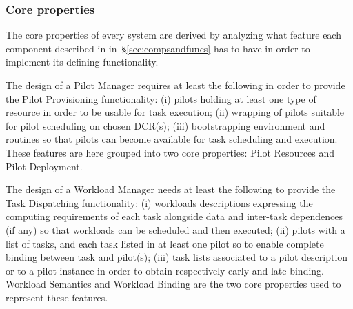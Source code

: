 \documentclass{sig-alternate}
\begin{document}

\subsubsection{Core properties}
\label{sec:coreprops}

The core properties of every \pilot system are derived by analyzing what feature
each component described in in~\S\ref{sec:compsandfuncs} has to have in order to
implement its defining functionality.

The design of a Pilot Manager requires at least the following in order to
provide the Pilot Provisioning functionality: (i) pilots holding at least one
type of resource in order to be usable for task execution; (ii) wrapping of
pilots suitable for pilot scheduling on chosen DCR(s); (iii) bootstrapping
environment and routines so that pilots can become available for task scheduling
and execution. These features are here grouped into two core properties: Pilot
Resources and Pilot Deployment.

The design of a Workload Manager needs at least the following to provide the
Task Dispatching functionality: (i) workloads descriptions expressing the
computing requirements of each task alongside data and inter-task dependences
(if any) so that workloads can be scheduled and then executed; (ii) pilots with
a list of tasks, and each task listed in at least one pilot so to enable
complete binding between task and pilot(s); (iii) task lists associated to a
pilot description or to a pilot instance in order to obtain respectively early
and late binding. Workload Semantics and Workload Binding are the two core
properties used to represent these features.
\end{document}
